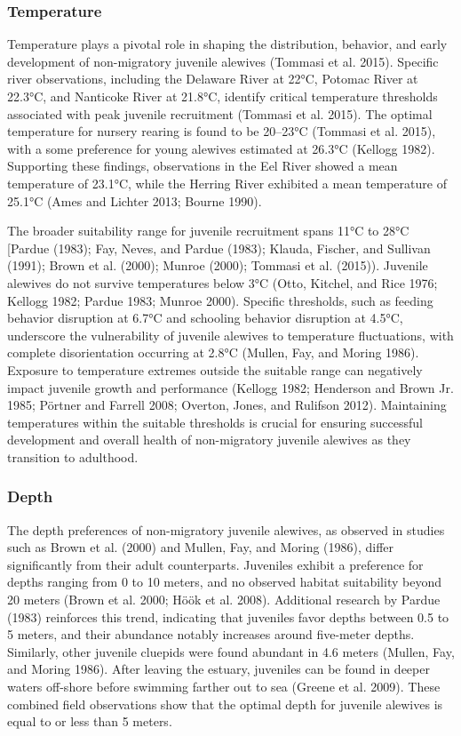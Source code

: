 \documentclass[
]{book}
\begin{document}
\hypertarget{temperature-1}{%
\subsubsection{Temperature}\label{temperature-1}}

Temperature plays a pivotal role in shaping the distribution, behavior, and early development of non-migratory juvenile alewives (Tommasi et al. 2015). Specific river observations, including the Delaware River at 22°C, Potomac River at 22.3°C, and Nanticoke River at 21.8°C, identify critical temperature thresholds associated with peak juvenile recruitment (Tommasi et al. 2015). The optimal temperature for nursery rearing is found to be 20--23°C (Tommasi et al. 2015), with a some preference for young alewives estimated at 26.3°C (Kellogg 1982). Supporting these findings, observations in the Eel River showed a mean temperature of 23.1°C, while the Herring River exhibited a mean temperature of 25.1°C (Ames and Lichter 2013; Bourne 1990).

The broader suitability range for juvenile recruitment spans 11°C to 28°C {[}Pardue (1983); Fay, Neves, and Pardue (1983); Klauda, Fischer, and Sullivan (1991); Brown et al. (2000); Munroe (2000); Tommasi et al. (2015)). Juvenile alewives do not survive temperatures below 3°C (Otto, Kitchel, and Rice 1976; Kellogg 1982; Pardue 1983; Munroe 2000). Specific thresholds, such as feeding behavior disruption at 6.7°C and schooling behavior disruption at 4.5°C, underscore the vulnerability of juvenile alewives to temperature fluctuations, with complete disorientation occurring at 2.8°C (Mullen, Fay, and Moring 1986). Exposure to temperature extremes outside the suitable range can negatively impact juvenile growth and performance (Kellogg 1982; Henderson and Brown Jr. 1985; Pörtner and Farrell 2008; Overton, Jones, and Rulifson 2012). Maintaining temperatures within the suitable thresholds is crucial for ensuring successful development and overall health of non-migratory juvenile alewives as they transition to adulthood.

\hypertarget{depth-1}{%
\subsubsection{Depth}\label{depth-1}}

The depth preferences of non-migratory juvenile alewives, as observed in studies such as Brown et al. (2000) and Mullen, Fay, and Moring (1986), differ significantly from their adult counterparts. Juveniles exhibit a preference for depths ranging from 0 to 10 meters, and no observed habitat suitability beyond 20 meters (Brown et al. 2000; Höök et al. 2008). Additional research by Pardue (1983) reinforces this trend, indicating that juveniles favor depths between 0.5 to 5 meters, and their abundance notably increases around five-meter depths. Similarly, other juvenile cluepids were found abundant in 4.6 meters (Mullen, Fay, and Moring 1986). After leaving the estuary, juveniles can be found in deeper waters off-shore before swimming farther out to sea (Greene et al. 2009). These combined field observations show that the optimal depth for juvenile alewives is equal to or less than 5 meters.
\end{document}
